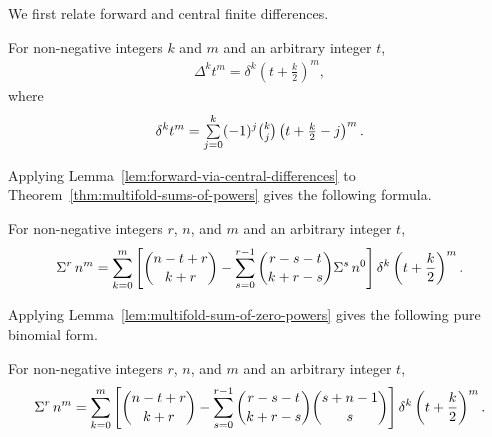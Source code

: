 We first relate forward and central finite differences.
\begin{lemma}
  For non-negative integers $k$ and $m$ and an arbitrary integer $t$,
  \label{lem:forward-via-central-differences}
  \begin{align*}
    \Delta^{k} t^{m} = \delta^{k} \left( t+ \frac{k}{2} \right)^{m},
  \end{align*}
  where
  \begin{align*}
    \delta^{k} t^m
    = \mathop{\textstyle\sum}_{j=0}^{k} (-1)^j \tbinom{k}{j}
    \left(
      t + \tfrac{k}{2} - j
    \right)^{m}.
  \end{align*}
\end{lemma}
Applying Lemma~\eqref{lem:forward-via-central-differences} to Theorem~\eqref{thm:multifold-sums-of-powers} gives the following formula.
\begin{proposition}
  \label{prop:multifold-central-sums}
  For non-negative integers $r$, $n$, and $m$ and an arbitrary integer $t$,
  \begin{align*}
    \Sigma^{r}\,{n}^{m}
    = \sum_{k=0}^{m}
    \left[
      \binom{n-t+r}{k+r}
      -
      \sum_{s=0}^{r-1}
      \binom{r-s-t}{k+r-s}
      \Sigma^{s}\,{n}^{0}
    \right] \delta^{k} \left( t+ \frac{k}{2} \right)^{m}.
  \end{align*}
\end{proposition}
Applying Lemma~\eqref{lem:multifold-sum-of-zero-powers} gives the following pure binomial form.
\begin{proposition}
  \label{prop:multifold-central-binomial-sums}
  For non-negative integers $r$, $n$, and $m$ and an arbitrary integer $t$,
  \begin{align*}
    \Sigma^{r}\,{n}^{m}
    = \sum_{k=0}^{m}
    \left[
      \binom{n-t+r}{k+r}
      -
      \sum_{s=0}^{r-1}
      \binom{r-s-t}{k+r-s}
      \binom{s+n-1}{s}
    \right] \delta^{k} \left( t+ \frac{k}{2} \right)^{m}.
  \end{align*}
\end{proposition}
